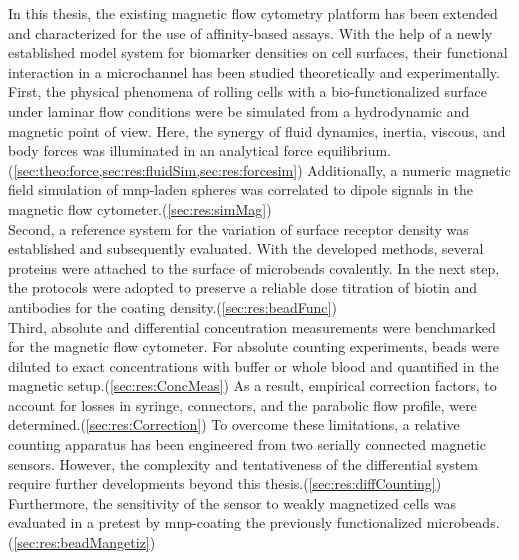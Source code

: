 In this thesis, the existing magnetic flow cytometry platform has been extended and characterized for the use of affinity-based assays. With the help of a newly established model system for biomarker densities on cell surfaces, their functional interaction in a microchannel has been studied theoretically and experimentally.\\
First, the physical phenomena of rolling cells with a bio-functionalized surface under laminar flow conditions were be simulated from a hydrodynamic and magnetic point of view. Here, the synergy of fluid dynamics, inertia, viscous, and body forces was illuminated in an analytical force equilibrium.(\cref{sec:theo:force,sec:res:fluidSim,sec:res:forcesim}) Additionally, a numeric magnetic field simulation of \gls{mnp}-laden spheres was correlated to dipole signals in the magnetic flow cytometer.(\cref{sec:res:simMag})\\
Second, a reference system for the variation of surface receptor density was established and subsequently evaluated. With the developed methods, several proteins were attached to the surface of microbeads covalently. In the next step, the protocols were adopted to preserve a reliable dose titration of biotin and antibodies for the coating density.(\cref{sec:res:beadFunc}) \\
Third, absolute and differential concentration measurements were benchmarked for the magnetic flow cytometer. For absolute counting experiments, beads were diluted to exact concentrations with buffer or whole blood and quantified in the magnetic setup.(\cref{sec:res:ConcMeas}) As a result, empirical correction factors, to account for losses in syringe, connectors, and the parabolic flow profile, were determined.(\cref{sec:res:Correction}) To overcome these limitations, a relative counting apparatus has been engineered from two serially connected magnetic sensors. However, the complexity and tentativeness of the differential system require further developments beyond this thesis.(\cref{sec:res:diffCounting}) Furthermore, the sensitivity of the sensor to weakly magnetized cells was evaluated in a pretest by \gls{mnp}-coating the previously functionalized microbeads.(\cref{sec:res:beadMangetiz}) \\

